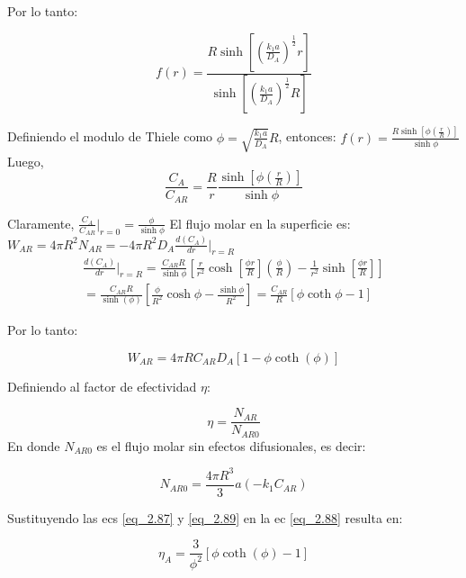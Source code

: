 Por lo tanto:

\begin{equation}
    f(r)=\frac{R\sinh[(\frac{k_1a}{D_A})^\frac{1}{2}r]}{\sinh[(\frac{k_1a}{D_A})^\frac{1}{2}R]}
\end{equation}

Definiendo el modulo de Thiele como $\phi=\sqrt{\frac{k_1a}{D_A}}R$, entonces:
    $f(r)=\frac{R\sinh[\phi(\frac{r}{R})]}{\sinh\phi}$
Luego, 
\begin{equation}
    \frac{C_A}{C_{AR}}=\frac{R}{r}\frac{\sinh[\phi(\frac{r}{R})]}{\sinh\phi}
\end{equation}


Claramente, $\frac{C_A}{C_{AR}}|_{r=0}=\frac{\phi}{\sinh\phi}$ 
\newline
El flujo molar en la superficie es: $W_{AR}=4\pi R^2N_{AR}=-4\pi R^2D_A\frac{d(C_A)}{dr}|_{r=R}$
\begin{equation*}
\begin{split}
        \frac{d(C_A)}{dr}|_{r=R}=\frac{C_{AR}R}{\sinh \phi}\left[\frac{r}{r^2}\cosh\left[\frac{\phi r}{R}\right]\left(\frac{\phi}{R}\right)-\frac{1}{r^2}\sinh \left[\frac{\phi r}{R}\right]\right]\\
=\frac{C_{AR}R}{\sinh (\phi)}\left[\frac{\phi}{R^2}\cosh \phi-\frac{\sinh \phi}{R^2}\right]=\frac{C_{AR}}{R}[\phi \coth \phi-1]
\end{split}
\end{equation*}

Por lo tanto:

\begin{equation}
    W_{AR}=4\pi RC_{AR}D_A[1-\phi \coth (\phi)]
    \label{eq_2.87}
\end{equation}

Definiendo al factor de efectividad $\eta$:

\begin{equation}
    \eta=\frac{N_{AR}}{N_{AR0}}
    \label{eq_2.88}
\end{equation}
En donde $N_{AR0}$ es el flujo molar sin efectos difusionales, es decir:

\begin{equation}
    N_{AR0}=\frac{4\pi R^3}{3}a(-k_1C_{AR})
    \label{eq_2.89}
\end{equation}

Sustituyendo las ecs \eqref{eq_2.87} y \eqref{eq_2.89} en la ec \eqref{eq_2.88} resulta en: 

\begin{equation}
    \eta_A=\frac{3}{\phi^2}[\phi \coth (\phi)-1]
    \label{eq_2.90}
\end{equation}


